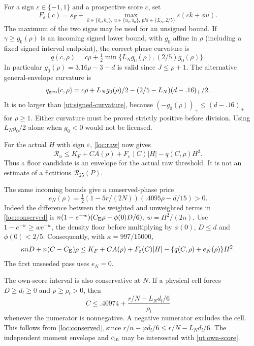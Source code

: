 For a sign $\varepsilon\in\{-1,1\}$ and a prospective score $c$, set
\[
 F_\varepsilon(c)=s_F+
 \max_{k\in\{k_l,k_u\},\,u\in\{u_l,u_u\},\,phi\in\{L_N,2/5\}}
                  \varepsilon(ck+\phi u).
\]
The maximum of the two signs may be used for an unsigned bound.
If $\gamma\ge g_0(\rho)$ is an incoming signed lower bound, with
$g_0$ affine in $\rho$ (including a fixed signed interval endpoint),
the correct phase curvature is
\begin{equation}\label{ut:signed-curvature}
 q(c,\rho)=c\rho+\tfrac12
           \min\{L_N g_0(\rho),(2/5)g_0(\rho)\}.
\end{equation}
In particular $g_0(\rho)=3.16\rho-3-d$ is valid since
$J\le\rho+1$. The alternative general-envelope curvature is
\[
 q_{\rm gen}(c,\rho)=c\rho+L_Ng_0(\rho)/2
                    -(2/5-L_N)(d-.16)_+/2.
\]
It is no larger than \eqref{ut:signed-curvature}, because
$(-g_0(\rho))_+\le(d-.16)_+$ for $\rho\ge1$.
Either curvature must be proved strictly positive before division.
Using $L_Ng_0/2$ alone when $g_0<0$ would not be licensed.

For the actual $H$ with sign $\varepsilon$, \eqref{loc:raw} now gives
\begin{equation}\label{ut:raw-candidate}
 \mathcal R_n\le K_F+C A(\rho)+F_\varepsilon(C)|H|
                                      -q(C,\rho)H^2.
\end{equation}
Thus a floor candidate is an envelope for the actual raw threshold.
It is not an estimate of a fictitious $\mathcal R_{25}(P)$.

The same incoming bounds give a conserved-phase price
\begin{equation}\label{ut:rebate}
 e_N(\rho)=\tfrac12(1-5r/(2N))(.4095\rho-d/15)>0.
\end{equation}
Indeed the difference between the weighted and unweighted terms in
\eqref{loc:conserved} is
$n(1-e^{-w})(C_{\mathrm E}\rho-\phi(0)D/6)$, $w=H^2/(2n)$.
Use $1-e^{-w}\ge we^{-w}$, the density floor before multiplying by
$\phi(0)$, $D\le d$ and $\phi(0)<2/5$.
Consequently, with $\kappa=997/15000$,
\begin{equation}\label{ut:charged-candidate}
 \kappa nD+n(C-C_{\mathrm E})\rho
 \le K_F+C A(\rho)+F_\varepsilon(C)|H|
                       -\{q(C,\rho)+e_N(\rho)\}H^2.
\end{equation}
The first unseeded pass uses $e_N=0$.

The own-score interval is also conservative at $N$. If a physical
cell forces $D\ge d_l\ge0$ and $\rho\ge\rho_l>0$, then
\begin{equation}\label{ut:own-score}
 C\le .40974+
 \frac{r/N-L_Nd_l/6}{\rho_l}
\end{equation}
whenever the numerator is nonnegative. A negative numerator excludes
the cell. This follows from \eqref{loc:conserved}, since
$r/n-\varphi d_l/6\le r/N-L_Nd_l/6$.
The independent moment envelope and $c_{\rm in}$ may be intersected
with \eqref{ut:own-score}.

